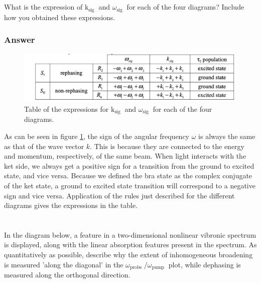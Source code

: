\documentclass[12pt]{article}
\begin{document}
\subsection{}
What is the expression of $\mathrm{k}_{\text {sig }}$ and $\omega_{\text {sig }}$ for each of the four diagrams? Include how you obtained these expressions.
\subsubsection{Answer}
\begin{figure}[h]
\includegraphics[max width=\textwidth, center]{table.png}
\caption{Table of the expressions for $\mathrm{k}_{\text {sig }}$ and $\omega_{\text {sig }}$ for each of the four diagrams.}
\label{fig:table}
\end{figure}
As can be seen in figure \ref{fig:table}, the sign of the angular frequency $\omega$ is always the same as that of the wave vector $k$. This is because they are connected to the energy and momentum, respectively, of the same beam. When light interacts with the ket side, we always get a positive sign for a transition from the ground to excited state, and vice versa. Because we defined the bra state as the complex conjugate of the ket state, a ground to excited state transition will correspond to a negative sign and vice versa. Application of the rules just described for the different diagrams gives the expressions in the table.
\section{}
In the diagram below, a feature in a two-dimensional nonlinear vibronic spectrum is displayed, along with the linear absorption features present in the spectrum. As quantitatively as possible, describe why the extent of inhomogeneous broadening is measured 'along the diagonal' in the $\omega_{\text {probe }} / \omega_{\text {pump }}$ plot, while dephasing is measured along the orthogonal direction.
\end{document}

